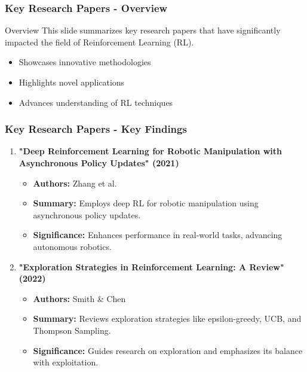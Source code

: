 \documentclass[aspectratio=169]{beamer}
\begin{document}
\begin{frame}[fragile]
    \frametitle{Key Research Papers - Overview}
    \begin{block}{Overview}
        This slide summarizes key research papers that have significantly impacted the field of Reinforcement Learning (RL).
        \begin{itemize}
            \item Showcases innovative methodologies
            \item Highlights novel applications 
            \item Advances understanding of RL techniques
        \end{itemize}
    \end{block}
\end{frame}

\begin{frame}[fragile]
    \frametitle{Key Research Papers - Key Findings}
    \begin{enumerate}
        \item \textbf{"Deep Reinforcement Learning for Robotic Manipulation with Asynchronous Policy Updates" (2021)}
            \begin{itemize}
                \item \textbf{Authors:} Zhang et al.
                \item \textbf{Summary:} Employs deep RL for robotic manipulation using asynchronous policy updates.
                \item \textbf{Significance:} Enhances performance in real-world tasks, advancing autonomous robotics.
            \end{itemize}
        \item \textbf{"Exploration Strategies in Reinforcement Learning: A Review" (2022)}
            \begin{itemize}
                \item \textbf{Authors:} Smith \& Chen
                \item \textbf{Summary:} Reviews exploration strategies like epsilon-greedy, UCB, and Thompson Sampling.
                \item \textbf{Significance:} Guides research on exploration and emphasizes its balance with exploitation.
            \end{itemize}
    \end{enumerate}
\end{frame}
\end{document}
